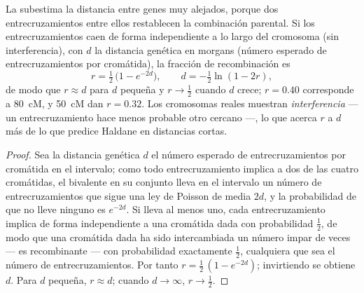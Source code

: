 \begin{theorem}\label{thm:b2:meiosis-heredity:haldane}
La  subestima la distancia entre genes muy
alejados, porque dos entrecruzamientos entre ellos restablecen la
combinación parental. Si los entrecruzamientos caen de forma
independiente a lo largo del cromosoma (sin interferencia), con $d$ la
distancia genética en morgans (número esperado de entrecruzamientos por
cromátida), la fracción de recombinación es
\[
r = \tfrac12\,\bigl(1 - e^{-2d}\bigr), \qquad d = -\tfrac12\ln(1 - 2r),
\]
de modo que $r \approx d$ para $d$ pequeña y $r \to \tfrac12$ cuando $d$
crece; $r = 0.40$ corresponde a \qty{80}{cM}, y \qty{50}{cM}
dan $r = 0.32$. Los cromosomas reales muestran \emph{interferencia} ---
un entrecruzamiento hace menos probable otro cercano ---, lo que acerca
$r$ a $d$ más de lo que predice Haldane en distancias cortas.
\end{theorem}
\begin{proof}
Sea la distancia genética $d$ el número esperado de entrecruzamientos por
cromátida en el intervalo; como todo entrecruzamiento implica a dos de
las cuatro cromátidas, el bivalente en su conjunto lleva en el intervalo
un número de entrecruzamientos que sigue una ley de Poisson de media
$2d$, y la probabilidad de que no lleve ninguno es $e^{-2d}$. Si lleva al
menos uno, cada entrecruzamiento implica de forma independiente a una
cromátida dada con probabilidad
$\tfrac12$, de modo que una cromátida dada ha sido intercambiada un
número impar de veces --- es recombinante --- con probabilidad
exactamente $\tfrac12$, cualquiera que sea el número de
entrecruzamientos. Por tanto $r = \tfrac12\,(1 -
e^{-2d})$; invirtiendo se obtiene $d$. Para $d$ pequeña, $r \approx d$;
cuando $d \to \infty$, $r \to \tfrac12$.
\end{proof}
